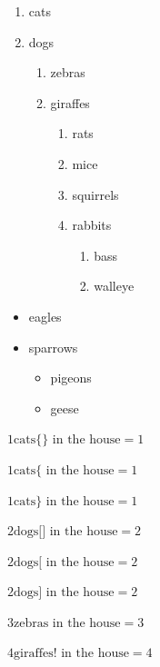 \documentclass[
  letterpaper,
]{article}
\providecommand{\tightlist}{%
  \setlength{\itemsep}{0pt}\setlength{\parskip}{0pt}}
\begin{document}
\begin{enumerate}
\def\labelenumi{\arabic{enumi}.}
\tightlist
\item
  cats
\item
  dogs

  \begin{enumerate}
  \def\labelenumii{\alph{enumii}.}
  \tightlist
  \item
    zebras
  \item
    giraffes

    \begin{enumerate}
    \def\labelenumiii{\roman{enumiii}.}
    \tightlist
    \item
      rats
    \item
      mice
    \item
      squirrels
    \item
      rabbits

      \begin{enumerate}
      \def\labelenumiv{\arabic{enumiv}.}
      \tightlist
      \item
        bass
      \item
        walleye
      \end{enumerate}
    \end{enumerate}
  \end{enumerate}
\end{enumerate}

\begin{itemize}
\tightlist
\item
  eagles
\item
  sparrows

  \begin{itemize}
  \tightlist
  \item
    pigeons
  \item
    geese
  \end{itemize}
\end{itemize}

\(1\text{cats\{{}\}{} in the house}= 1\)

\(1\text{cats\{{} in the house}= 1\)

\(1\text{cats\}{} in the house}= 1\)

\(2\text{dogs[] in the house}= 2\)

\(2\text{dogs[ in the house}= 2\)

\(2\text{dogs] in the house}= 2\)

\(3\text{zebras in the house}= 3\)

\(4\text{giraffes! in the house}= 4\)
\end{document}
